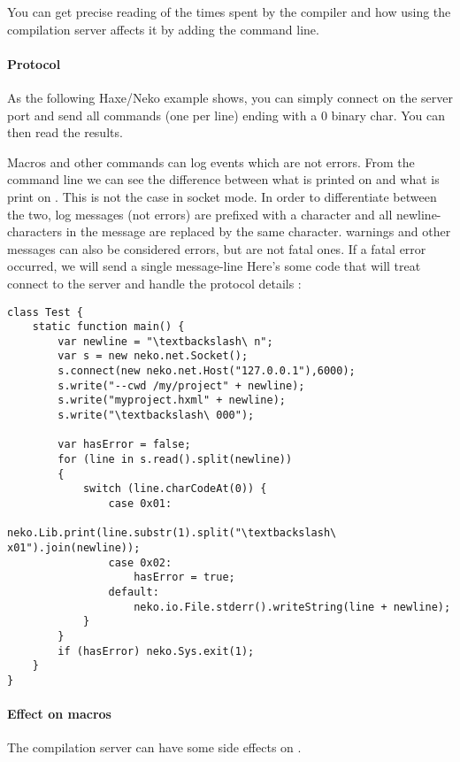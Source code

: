 You can get precise reading of the times spent by the compiler and how using the compilation server affects it by adding the  command line.

\paragraph{Protocol}
As the following Haxe/Neko example shows, you can simply connect on the server port and send all commands (one per line) ending with a 0 binary char. You can then read the results.

Macros and other commands can log events which are not errors. From the command line we can see the difference between what is printed on  and what is print on . This is not the case in socket mode. In order to differentiate between the two, log messages (not errors) are prefixed with a  character and all newline-characters in the message are replaced by the same  character.
warnings and other messages can also be considered errors, but are not fatal ones. If a fatal error occurred, we will send a single  message-line
Here's some code that will treat connect to the server and handle the protocol details :

\begin{lstlisting}
class Test {
    static function main() {
		var newline = "\textbackslash\ n";
        var s = new neko.net.Socket();
        s.connect(new neko.net.Host("127.0.0.1"),6000);
        s.write("--cwd /my/project" + newline);
        s.write("myproject.hxml" + newline);
        s.write("\textbackslash\ 000");
		
        var hasError = false;
        for (line in s.read().split(newline))
		{
            switch (line.charCodeAt(0)) {
				case 0x01: 
					neko.Lib.print(line.substr(1).split("\textbackslash\ x01").join(newline));
				case 0x02: 
					hasError = true;
				default: 
					neko.io.File.stderr().writeString(line + newline);
            }
		}
        if (hasError) neko.Sys.exit(1);
    }
}
\end{lstlisting}

\paragraph{Effect on macros}
The compilation server can have some side effects on .

